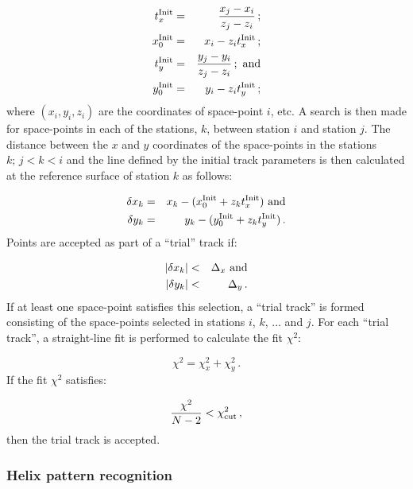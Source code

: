 \begin{eqnarray}
  t_x^{\rm Init} & = & \frac{x_j - x_i}{z_j - z_i} \,;        \\
  x_0^{\rm Init} & = & x_i - z_i t_x^{\rm Init}      \,;        \\
  t_y^{\rm Init} & = & \frac{y_j - y_i}{z_j - z_i} \,; {\rm~and} \\
  y_0^{\rm Init} & = & y_i - z_i t_y^{\rm Init} \,;
\end{eqnarray}
where $(x_i, y_i, z_i)$ are the coordinates of space-point $i$, etc. A search is then made for space-points in each of the stations, $k$, between station $i$ and station $j$. The distance between the $x$ and $y$ coordinates of the space-points in the stations $k;\,j<k<i$ and the line defined by the initial track parameters is then calculated at the reference surface of station $k$ as follows:

\begin{eqnarray}
  \delta x_k & = & x_k - (x_0^{\rm Init} + z_k t_x^{\rm Init}) {\rm~and} \\
  \delta y_k & = & y_k - (y_0^{\rm Init} + z_k t_y^{\rm Init}) \,.
\end{eqnarray}
Points are accepted as part of a ``trial'' track if:

\begin{eqnarray}
  | \delta x_k | & < & \Delta_x {\rm~and} \\
  | \delta y_k | & < & \Delta_y \,.
\end{eqnarray}
If at least one space-point satisfies this selection, a ``trial track'' is formed consisting of the space-points selected in stations $i$, $k$, ... and $j$. For each ``trial track'', a straight-line fit is performed to calculate the fit $\chi^2$:

\begin{equation}
  \chi^2 = \chi_x^2 + \chi_y^2 \,.
\end{equation}
If the fit $\chi^2$ satisfies:

\begin{equation}
  \frac{\chi^2}{N-2} < \chi^2_{\rm cut} \,,
\end{equation}
then the trial track is accepted. %

\subsubsection{Helix pattern recognition}
\label{SubSect:SciFiHelicalPatRec}

